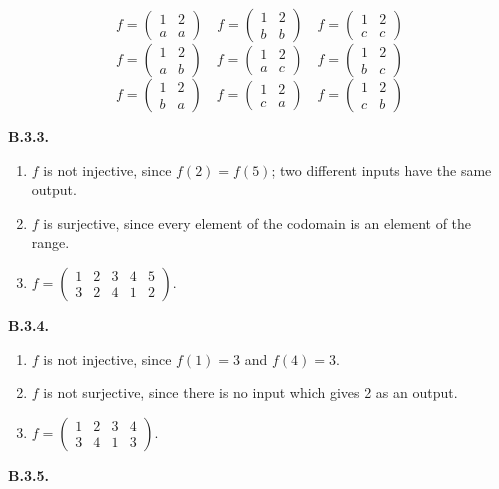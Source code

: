 \documentclass[10pt,]{book}
\theoremstyle{plain}
\theoremstyle{definition}
\theoremstyle{definition}
\theoremstyle{definition}
\theoremstyle{definition}
\numberwithin{equation}{chapter}
\newcommand{\twoline}[2]{\begin{pmatrix}#1 \\ #2 \end{pmatrix}}
\newcommand{\amp}{&}
\begin{document}
\begin{equation*}
f = \twoline{1 \amp 2}{a\amp a} \quad f = \twoline{1 \amp 2}{b \amp b} \quad f = \twoline{1 \amp 2}{c \amp c}
\end{equation*}
%
\begin{equation*}
f = \twoline{1 \amp 2}{a\amp b} \quad f = \twoline{1 \amp 2}{a \amp c} \quad f = \twoline{1 \amp 2}{b \amp c}
\end{equation*}
%
\begin{equation*}
f = \twoline{1 \amp 2}{b \amp a} \quad f = \twoline{1 \amp 2}{c \amp a} \quad f = \twoline{1 \amp 2}{c \amp b}
\end{equation*}
%
\par\smallskip
\noindent\textbf{B.3.3.} \hypertarget{p-1795}{}%
\leavevmode%
\begin{enumerate}[label=(\alph*)]
\item\hypertarget{li-564}{}\hypertarget{p-1796}{}%
\(f\) is not injective, since \(f(2) = f(5)\);  two different inputs have the same output.%
\item\hypertarget{li-565}{}\hypertarget{p-1797}{}%
\(f\) is surjective, since every element of the codomain is an element of the range.%
\item\hypertarget{li-566}{}\hypertarget{p-1798}{}%
\(f=\begin{pmatrix}1 \amp 2 \amp 3 \amp 4 \amp 5 \\ 3 \amp 2 \amp 4 \amp 1 \amp 2\end{pmatrix}\).%
\end{enumerate}
%
\par\smallskip
\noindent\textbf{B.3.4.} \hypertarget{p-1804}{}%
\leavevmode%
\begin{enumerate}[label=(\alph*)]
\item\hypertarget{li-570}{}\hypertarget{p-1805}{}%
\(f\) is not injective, since \(f(1) = 3\) and \(f(4) = 3\).%
\item\hypertarget{li-571}{}\hypertarget{p-1806}{}%
\(f\) is not surjective, since there is no input which gives 2 as an output.%
\item\hypertarget{li-572}{}\hypertarget{p-1807}{}%
\(f=\begin{pmatrix} 1 \amp 2 \amp 3 \amp 4 \\ 3 \amp 4 \amp 1 \amp 3\end{pmatrix}\).%
\end{enumerate}
%
\par\smallskip
\noindent\textbf{B.3.5.} \hypertarget{p-1809}{}%
\leavevmode%
\end{document}

